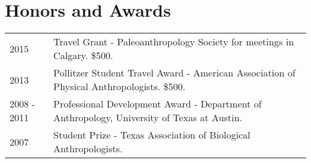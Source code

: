 \documentclass{article}
\newenvironment{mylist}
{\begin{description}[style=unboxed,leftmargin=1.3cm]}
{\end{description}}
\begin{document}
\begin{comment}
\begin{mylist}
\item[] {\bfseries In Prep}

\item[] {\bfseries Barr WA}.  Beyond 'Mosaic': mammalian functional diversity and habitat heterogeneity in human evolution. To be submitted to \emph{Journal of Human Evolution}.
\item[] {\bfseries Barr WA}.  The morphology of the bovid calcaneus: function, phylogeny, and allometric scaling. To be submitted to \emph{Journal of Morphology}.

\end{mylist}
\end{comment}


\section*{Honors and Awards}

\begin{tabular}{p{}p{}}
2015 & Travel Grant - Paleoanthropology Society for meetings in Calgary. \$500.\\[4pt]
2013 & Pollitzer Student Travel Award - American Association of Physical Anthropologists. \$500.\\[4pt]
2008 - 2011 & Professional Development Award - Department of Anthropology, University of Texas at Austin.\\[4pt]
2007 & Student Prize - Texas Association of Biological Anthropologists.\\
\end{tabular}
\end{document}
